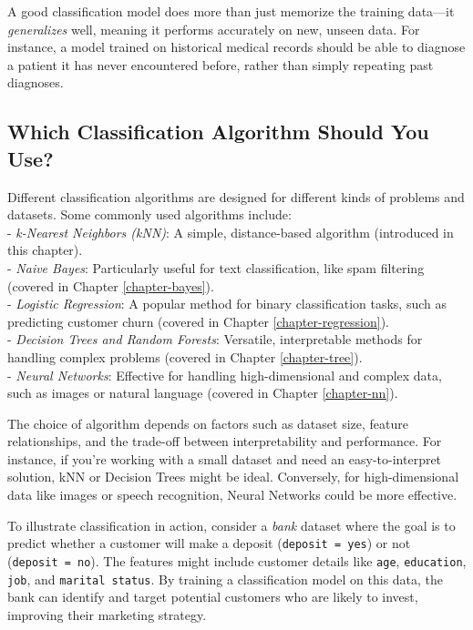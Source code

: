 \documentclass[
  11pt,
]{book}
\theoremstyle{definition}
\theoremstyle{definition}
\theoremstyle{definition}
\theoremstyle{definition}
\theoremstyle{remark}
\begin{document}
A good classification model does more than just memorize the training data---it \emph{generalizes} well, meaning it performs accurately on new, unseen data. For instance, a model trained on historical medical records should be able to diagnose a patient it has never encountered before, rather than simply repeating past diagnoses.

\subsection*{Which Classification Algorithm Should You Use?}\label{which-classification-algorithm-should-you-use}


Different classification algorithms are designed for different kinds of problems and datasets. Some commonly used algorithms include:\\
- \emph{k-Nearest Neighbors (kNN)}: A simple, distance-based algorithm (introduced in this chapter).\\
- \emph{Naive Bayes}: Particularly useful for text classification, like spam filtering (covered in Chapter \ref{chapter-bayes}).\\
- \emph{Logistic Regression}: A popular method for binary classification tasks, such as predicting customer churn (covered in Chapter \ref{chapter-regression}).\\
- \emph{Decision Trees and Random Forests}: Versatile, interpretable methods for handling complex problems (covered in Chapter \ref{chapter-tree}).\\
- \emph{Neural Networks}: Effective for handling high-dimensional and complex data, such as images or natural language (covered in Chapter \ref{chapter-nn}).

The choice of algorithm depends on factors such as dataset size, feature relationships, and the trade-off between interpretability and performance. For instance, if you're working with a small dataset and need an easy-to-interpret solution, kNN or Decision Trees might be ideal. Conversely, for high-dimensional data like images or speech recognition, Neural Networks could be more effective.

To illustrate classification in action, consider a \emph{bank} dataset where the goal is to predict whether a customer will make a deposit (\texttt{deposit\ =\ yes}) or not (\texttt{deposit\ =\ no}). The features might include customer details like \texttt{age}, \texttt{education}, \texttt{job}, and \texttt{marital\ status}. By training a classification model on this data, the bank can identify and target potential customers who are likely to invest, improving their marketing strategy.
\end{document}
